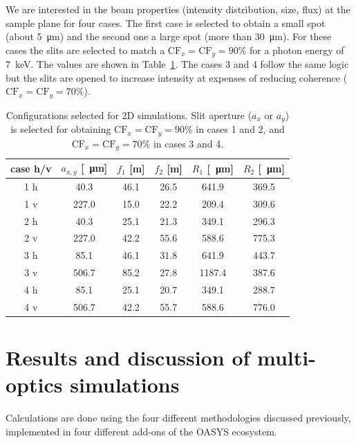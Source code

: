 \documentclass{iucr}              %
\begin{document}
We are interested in the beam properties (intensity distribution, size, flux) at the sample plane for four cases.
The first case is selected to obtain a small spot (about \SI{5}{\micro\meter}) and the second one a large spot (more than \SI{30}{\micro\meter}). For these cases the slits are selected to match a $\text{CF}_{x}=\text{CF}_{y}=90\%$ for a photon energy of \SI{7}{keV}. The values are shown in Table~\ref{table:2Dusercases}. The cases 3 and 4 follow the same logic but the slits are opened to increase intensity at expenses of reducing coherence  ($\text{CF}_{x}=\text{CF}_{y}=70\%$). 


\begin{table}[]
    \label{table:2Dusercases}
    \caption{Configurations selected for 2D simulations. Slit aperture ($a_x$ or $a_y$) is selected for obtaining $\text{CF}_{x}=\text{CF}_{y}=90\%$ in cases 1 and 2, and $\text{CF}_{x}=\text{CF}_{y}=70\%$ in cases 3 and 4. 
    }
    \begin{tabular}{c|c|c|c|c|c}
         case h/v & $a_{x,y}$ [\SI{}{\micro\meter}] & $f_1$ [m] & $f_2$ [m] & $R_1$ [\SI{}{\micro\meter}]& $R_2$ [\SI{}{\micro\meter}] \\
         \hline
1 h &      40.3 & 46.1 &     26.5 &     641.9 &     369.5 
\\
1 v &      227.0 & 15.0 &     22.2 &     209.4 &     309.6 
\\
\hline
2 h &      40.3 & 25.1 &     21.3 &     349.1 &     296.3  
\\
2 v &      227.0 & 42.2 &     55.6 &     588.6 &     775.3 
\\
\hline \hline
3 h &      85.1 & 46.1 &     31.8 &     641.9 &     443.7 
\\
3 v &      506.7 & 85.2 &     27.8 &     1187.4 &     387.6  
\\
\hline
4 h &      85.1 & 25.1 &     20.7 &     349.1 &     288.7 
\\
4 v &      506.7 & 42.2 &     55.7 &     588.6 &     776.0 

    \end{tabular}
\end{table}


\section{Results and discussion of multi-optics simulations}
\label{sec:complete-beamline}

Calculations are done using the four different methodologies discussed previously, implemented in four different add-ons of the OASYS ecosystem. 
\end{document}
